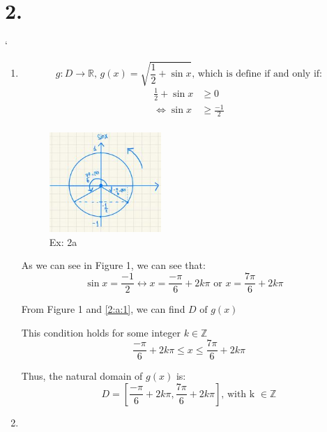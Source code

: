 \documentclass{article}
\begin{document}
    \section*{2.}
    `\begin{enumerate}[label=({\alph*})]
        \item 
        \[g: D \to \mathbb{R}\text{, } g(x) = \sqrt{\frac{1}{2} + \sin{x}} \text{, which is define if and only if:}\]
        \begin{align*}
            \frac{1}{2} + \sin{x} &\geq 0\\
            \Leftrightarrow \sin{x} &\geq \frac{-1}{2}\\
        \end{align*}


        \begin{figure}[ht]
			\centering
				 \includegraphics[width=0.4\textwidth]{circle.jpg} 
				 \caption{Ex: 2a}
				 \label{Ex:2a}
		\end{figure}

        As we can see in Figure 1, we can see that:
        \begin{equation}
            \sin{x} = \frac{-1}{2} \leftrightarrow x = \frac{-\pi}{6} + 2k\pi \text{ or } x = \frac{7\pi}{6} + 2k\pi \quad \label{2:a:1}  
        \end{equation}

        
        From Figure 1 and \eqref{2:a:1}, we can find \(D \text{ of } g(x)\)


        This condition holds for some integer \(k \in \mathbb{Z}\)
        \begin{equation}
            \frac{-\pi}{6} + 2k\pi \leq x \leq \frac{7\pi}{6} + 2k\pi
        \end{equation}

        Thus, the natural domain of \(g(x)\) is:
        \[D = [\frac{-\pi}{6} + 2k\pi, \frac{7\pi}{6} + 2k\pi] \text{, with k \(\in \mathbb{Z}\)}\]

        \item
        

\end{enumerate}
\end{document}
